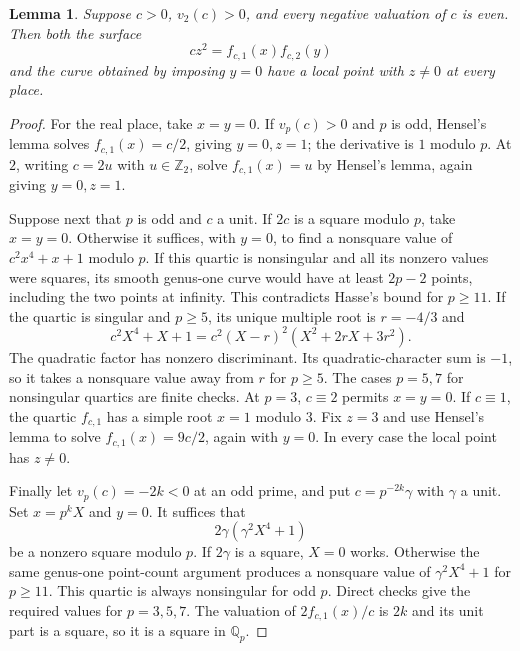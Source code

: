\documentclass[11pt]{article}
\newtheorem{lemma}[theorem]{Lemma}
\newcommand{\Q}{\mathbb Q}
\newcommand{\Z}{\mathbb Z}
\begin{document}
\begin{lemma}\label{local}
Suppose $c>0$, $v_2(c)>0$, and every negative valuation of $c$ is even.
Then both the surface
\[
 cz^2=f_{c,1}(x)f_{c,2}(y)
\]
and the curve obtained by imposing $y=0$ have a local point with
$z\ne0$ at every place.
\end{lemma}
\begin{proof}
For the real place, take $x=y=0$. If $v_p(c)>0$ and $p$ is odd,
Hensel's lemma solves $f_{c,1}(x)=c/2$, giving $y=0,z=1$; the derivative
is $1$ modulo $p$. At $2$, writing $c=2u$ with $u\in\Z_2$, solve
$f_{c,1}(x)=u$ by Hensel's lemma, again giving $y=0,z=1$.

Suppose next that $p$ is odd and $c$ a unit. If $2c$ is a square
modulo $p$, take $x=y=0$. Otherwise it suffices, with $y=0$, to find a
nonsquare value of $c^2x^4+x+1$ modulo $p$. If this quartic is
nonsingular and all its nonzero values were squares, its smooth genus-one
curve would have at least $2p-2$ points, including the two points at
infinity. This contradicts Hasse's bound for $p\ge11$. If the quartic
is singular and $p\ge5$, its unique multiple root is $r=-4/3$ and
\[
 c^2X^4+X+1=c^2(X-r)^2(X^2+2rX+3r^2).
\]
The quadratic factor has nonzero discriminant. Its quadratic-character
sum is $-1$, so it takes a nonsquare value away from $r$ for $p\ge5$.
The cases $p=5,7$ for nonsingular quartics are finite checks. At $p=3$,
$c\equiv2$ permits $x=y=0$. If $c\equiv1$, the quartic $f_{c,1}$ has
a simple root $x=1$ modulo $3$. Fix $z=3$ and use Hensel's lemma to
solve $f_{c,1}(x)=9c/2$, again with $y=0$. In every case the local
point has $z\ne0$.

Finally let $v_p(c)=-2k<0$ at an odd prime, and put $c=p^{-2k}\gamma$
with $\gamma$ a unit. Set $x=p^kX$ and $y=0$. It suffices that
\[
 2\gamma(\gamma^2X^4+1)
\]
be a nonzero square modulo $p$. If $2\gamma$ is a square, $X=0$ works.
Otherwise the same genus-one point-count argument produces a nonsquare
value of $\gamma^2X^4+1$ for $p\ge11$. This quartic is always
nonsingular for odd $p$. Direct checks give the required values for
$p=3,5,7$. The valuation of $2f_{c,1}(x)/c$ is $2k$ and its unit part
is a square, so it is a square in $\Q_p$.
\end{proof}
\end{document}
